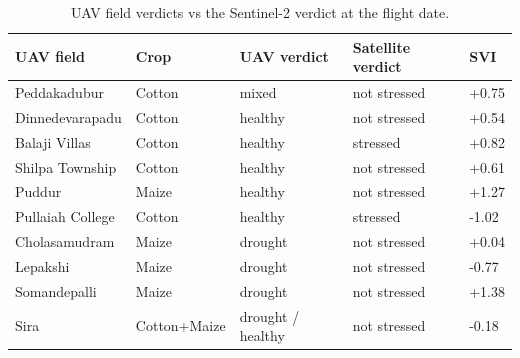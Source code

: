 \begin{table}[H]
\centering
\caption{UAV field verdicts vs the Sentinel-2 verdict at the flight date.}
\label{tab:s_uav}
\footnotesize
\begin{tabular}{@{}lllll@{}}
\toprule
\textbf{UAV field} & \textbf{Crop} & \textbf{UAV verdict} & \textbf{Satellite verdict} & \textbf{SVI} \\
\midrule
Peddakadubur & Cotton & mixed & not stressed & +0.75 \\
Dinnedevarapadu & Cotton & healthy & not stressed & +0.54 \\
Balaji Villas & Cotton & healthy & stressed & +0.82 \\
Shilpa Township & Cotton & healthy & not stressed & +0.61 \\
Puddur & Maize & healthy & not stressed & +1.27 \\
Pullaiah College & Cotton & healthy & stressed & -1.02 \\
Cholasamudram & Maize & drought & not stressed & +0.04 \\
Lepakshi & Maize & drought & not stressed & -0.77 \\
Somandepalli & Maize & drought & not stressed & +1.38 \\
Sira & Cotton+Maize & drought  / healthy & not stressed & -0.18 \\
\bottomrule
\end{tabular}
\end{table}
